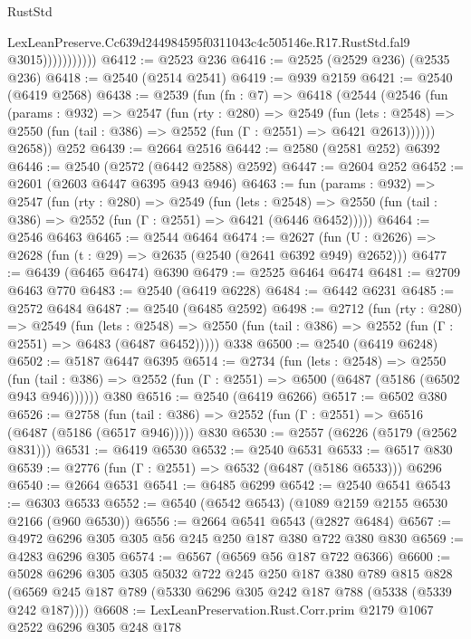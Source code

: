 \begin{lexlean}{RustStd}
\begin{coremodule}
                          LexLeanPreserve.Cc639d244984595f0311043c4c505146e.R17.RustStd.fal9
                          @3015)))))))))))
@6412 := @2523 @236
@6416 := @2525 (@2529 @236) (@2535 @236)
@6418 := @2540 (@2514 @2541)
@6419 := @939 @2159
@6421 := @2540 (@6419 @2568)
@6438 := @2539
    (fun (fn : @7) =>
    @6418
      (@2544
        (@2546
          (fun (params : @932) =>
          @2547
            (fun (rty : @280) =>
            @2549
              (fun (lets : @2548) =>
              @2550 (fun (tail : @386) => @2552 (fun (Γ : @2551) => @6421 @2613))))))
        @2658))
    @252
@6439 := @2664 @2516
@6442 := @2580 (@2581 @252) @6392
@6446 := @2540 (@2572 (@6442 @2588) @2592)
@6447 := @2604 @252
@6452 := @2601 (@2603 @6447 @6395 @943 @946)
@6463 := fun (params : @932) =>
  @2547
    (fun (rty : @280) =>
    @2549
      (fun (lets : @2548) =>
      @2550 (fun (tail : @386) => @2552 (fun (Γ : @2551) => @6421 (@6446 @6452)))))
@6464 := @2546 @6463
@6465 := @2544 @6464
@6474 := @2627 (fun (U : @2626) => @2628 (fun (t : @29) => @2635 (@2540 (@2641 @6392 @949) @2652)))
@6477 := @6439 (@6465 @6474) @6390
@6479 := @2525 @6464 @6474
@6481 := @2709 @6463 @770
@6483 := @2540 (@6419 @6228)
@6484 := @6442 @6231
@6485 := @2572 @6484
@6487 := @2540 (@6485 @2592)
@6498 := @2712
    (fun (rty : @280) =>
    @2549
      (fun (lets : @2548) =>
      @2550 (fun (tail : @386) => @2552 (fun (Γ : @2551) => @6483 (@6487 @6452)))))
    @338
@6500 := @2540 (@6419 @6248)
@6502 := @5187 @6447 @6395
@6514 := @2734
    (fun (lets : @2548) =>
    @2550 (fun (tail : @386) => @2552 (fun (Γ : @2551) => @6500 (@6487 (@5186 (@6502 @943 @946))))))
    @380
@6516 := @2540 (@6419 @6266)
@6517 := @6502 @380
@6526 := @2758
    (fun (tail : @386) => @2552 (fun (Γ : @2551) => @6516 (@6487 (@5186 (@6517 @946)))))
    @830
@6530 := @2557 (@6226 (@5179 (@2562 @831)))
@6531 := @6419 @6530
@6532 := @2540 @6531
@6533 := @6517 @830
@6539 := @2776 (fun (Γ : @2551) => @6532 (@6487 (@5186 @6533))) @6296
@6540 := @2664 @6531
@6541 := @6485 @6299
@6542 := @2540 @6541
@6543 := @6303 @6533
@6552 := @6540 (@6542 @6543) (@1089 @2159 @2155 @6530 @2166 (@960 @6530))
@6556 := @2664 @6541 @6543 (@2827 @6484)
@6567 := @4972 @6296 @305 @305 @56 @245 @250 @187 @380 @722 @380 @830
@6569 := @4283 @6296 @305
@6574 := @6567 (@6569 @56 @187 @722 @6366)
@6600 := @5028
    @6296
    @305
    @305
    @5032
    @722
    @245
    @250
    @187
    @380
    @789
    @815
    @828
    (@6569 @245 @187 @789 (@5330 @6296 @305 @242 @187 @788 (@5338 (@5339 @242 @187))))
@6608 := LexLeanPreservation.Rust.Corr.prim @2179 @1067 @2522 @6296 @305 @248 @178

\end{coremodule}
\end{lexlean}
